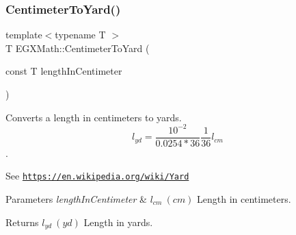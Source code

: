 \subsubsection{\texorpdfstring{Centimeter\+To\+Yard()}{CentimeterToYard()}}
{\footnotesize\ttfamily template$<$typename T $>$ \\
T E\+G\+X\+Math\+::\+Centimeter\+To\+Yard (\begin{DoxyParamCaption}\item[{const T}]{length\+In\+Centimeter }\end{DoxyParamCaption})}



Converts a length in centimeters to yards. \[ l_{yd}= \frac{10^{-2}}{0.0254 * 36} \frac{1}{36} l_{cm} \]. 

See \href{https://en.wikipedia.org/wiki/Yard}{\tt https\+://en.\+wikipedia.\+org/wiki/\+Yard} 
\begin{DoxyParams}{Parameters}
{\em length\+In\+Centimeter} & $ l_{cm}\ (cm)$ Length in centimeters. \\
\hline
\end{DoxyParams}
\begin{DoxyReturn}{Returns}
$ l_{yd}\ (yd)$ Length in yards. 
\end{DoxyReturn}

